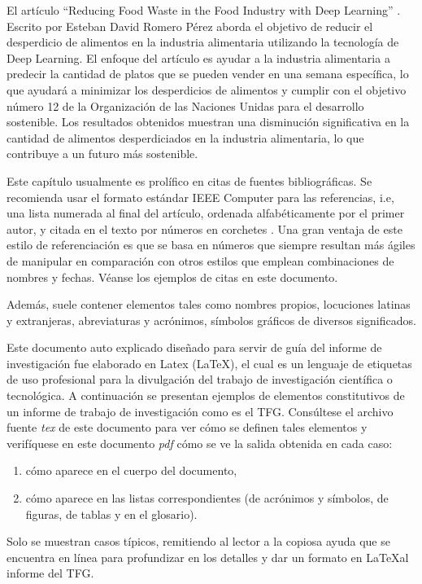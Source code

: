 \vspace{1\baselineskip}
El artículo “Reducing Food Waste in the Food Industry with Deep Learning” \cite{afanador2022diseno}. Escrito por Esteban David Romero Pérez aborda el objetivo de reducir el desperdicio de alimentos en la industria alimentaria utilizando la tecnología de Deep Learning. El enfoque del artículo es ayudar a la industria alimentaria a predecir la cantidad de platos que se pueden vender en una semana específica, lo que ayudará a minimizar los desperdicios de alimentos y cumplir con el objetivo número 12 de la Organización de las Naciones Unidas para el desarrollo sostenible. Los resultados obtenidos muestran una disminución significativa en la cantidad de alimentos desperdiciados en la industria alimentaria, lo que contribuye a un futuro más sostenible.

Este capítulo usualmente es prolífico en citas de fuentes bibliográficas. Se recomienda usar el formato estándar IEEE Computer para las referencias, i.e, una lista numerada al final del artículo, ordenada alfabéticamente por el primer autor, y citada en el texto por números en corchetes \cite{ieee}. Una gran ventaja de este estilo de referenciación es que se basa en números que siempre resultan más ágiles de manipular en comparación con otros estilos que emplean combinaciones de nombres y fechas. Véanse los ejemplos de citas en este documento.

 Además, suele contener elementos tales como nombres propios, locuciones latinas y extranjeras, abreviaturas y acrónimos, símbolos gráficos de diversos significados.

Este documento auto explicado diseñado para servir de guía del informe de investigación fue elaborado en Latex (\LaTeX), el cual es un lenguaje de etiquetas de uso profesional para la divulgación del trabajo de investigación científica o tecnológica. A continuación se presentan ejemplos de elementos constitutivos de un informe de trabajo de investigación como es el TFG. Consúltese el archivo fuente \textit{tex} de este documento para ver cómo se definen tales elementos y verifíquese en este documento \textit{pdf} cómo se ve la salida obtenida en cada caso:
\begin{enumerate}
\item cómo aparece en el cuerpo del documento,
\item cómo aparece en las listas correspondientes (de acrónimos y símbolos, de figuras, de tablas y en el glosario).
\end{enumerate}
Solo se muestran casos típicos, remitiendo al lector a la copiosa ayuda que se encuentra en línea para profundizar en los detalles y dar un formato en \LaTeX\space al informe del TFG.



